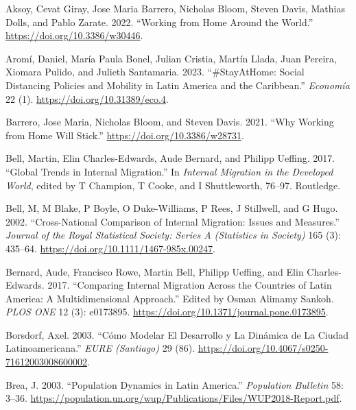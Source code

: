 \documentclass[
  11pt,
]{article}
\newlength{\cslhangindent}
\newlength{\cslentryspacingunit} %
\newenvironment{CSLReferences}[2] %
 {%
  \setlength{\parindent}{0pt}
  \ifodd #1
  \let\oldpar\par
  \def\par{\hangindent=\cslhangindent\oldpar}
  \fi
  \setlength{\parskip}{#2\cslentryspacingunit}
 }%
 {}
\begin{document}
\hypertarget{refs}{}
\begin{CSLReferences}{1}{0}
\leavevmode{}%
Aksoy, Cevat Giray, Jose Maria Barrero, Nicholas Bloom, Steven Davis,
Mathias Dolls, and Pablo Zarate. 2022. {``Working from Home Around the
World.''} \url{https://doi.org/10.3386/w30446}.

\leavevmode{}%
Aromí, Daniel, María Paula Bonel, Julian Cristia, Martín Llada, Juan
Pereira, Xiomara Pulido, and Julieth Santamaria. 2023. {``\#StayAtHome:
Social Distancing Policies and Mobility in Latin America and the
Caribbean.''} \emph{Economía} 22 (1).
\url{https://doi.org/10.31389/eco.4}.

\leavevmode{}%
Barrero, Jose Maria, Nicholas Bloom, and Steven Davis. 2021. {``Why
Working from Home Will Stick.''} \url{https://doi.org/10.3386/w28731}.

\leavevmode{}%
Bell, Martin, Elin Charles-Edwards, Aude Bernard, and Philipp Ueffing.
2017. {``Global Trends in Internal Migration.''} In \emph{Internal
Migration in the Developed World}, edited by T Champion, T Cooke, and I
Shuttleworth, 76--97. Routledge.

\leavevmode{}%
Bell, M, M Blake, P Boyle, O Duke-Williams, P Rees, J Stillwell, and G
Hugo. 2002. {``Cross-National Comparison of Internal Migration: Issues
and Measures.''} \emph{Journal of the Royal Statistical Society: Series
A (Statistics in Society)} 165 (3): 435--64.
\url{https://doi.org/10.1111/1467-985x.00247}.

\leavevmode{}%
Bernard, Aude, Francisco Rowe, Martin Bell, Philipp Ueffing, and Elin
Charles-Edwards. 2017. {``Comparing Internal Migration Across the
Countries of Latin America: A Multidimensional Approach.''} Edited by
Osman Alimamy Sankoh. \emph{PLOS ONE} 12 (3): e0173895.
\url{https://doi.org/10.1371/journal.pone.0173895}.

\leavevmode{}%
Borsdorf, Axel. 2003. {``Cómo Modelar El Desarrollo y La Dinámica de La
Ciudad Latinoamericana.''} \emph{EURE (Santiago)} 29 (86).
\url{https://doi.org/10.4067/s0250-71612003008600002}.

\leavevmode{}%
Brea, J. 2003. {``Population Dynamics in Latin America.''}
\emph{Population Bulletin} 58: 3--36.
\url{https://population.un.org/wup/Publications/Files/WUP2018-Report.pdf}.


\end{CSLReferences}
\end{document}
